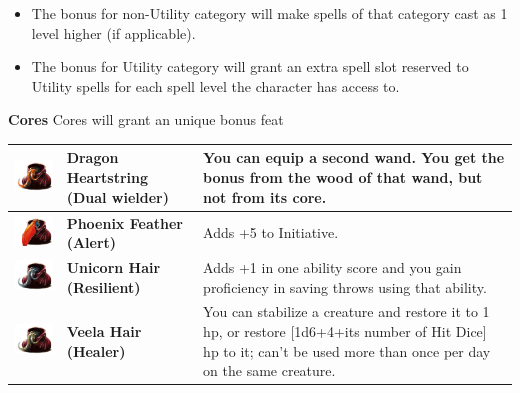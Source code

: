 \pagebreak 
\begin{itemize}
    \item The bonus for non-Utility category will make spells of that category cast as 1 level higher (if applicable).
    \item The bonus for Utility category will grant an extra spell slot reserved to Utility spells for each spell level the character has access to.
\end{itemize}

\textbf{Cores} Cores will grant an unique bonus feat \\

\begin{tabular}{ m{4cm}m{3cm}m{6cm} } \hline
	\includegraphics[width=4cm]{../Pictures/Gameplay/Items/Wearables/Wand/Cores/Dragon_heartstring_icon.png} & \textbf{Dragon Heartstring (Dual wielder)} & You can equip a second wand. You get the bonus from the wood of that wand, but not from its core. \\ \hline
	\includegraphics[width=4cm]{../Pictures/Gameplay/Items/Wearables/Wand/Cores/Phoenix_feather_icon.png} & \textbf{Phoenix Feather (Alert)} & Adds +5 to Initiative. \\ \hline
	\includegraphics[width=4cm]{../Pictures/Gameplay/Items/Wearables/Wand/Cores/Unicorn_hair_icon.png} & \textbf{Unicorn Hair (Resilient)} & Adds +1 in one ability score and you gain proficiency in saving throws using that ability.  \\ \hline
	\includegraphics[width=4cm]{../Pictures/Gameplay/Items/Wearables/Wand/Cores/Veela_hair_icon.png} & \textbf{Veela Hair (Healer)} & You can stabilize a creature and restore it to 1 hp, or restore [1d6+4+its number of Hit Dice] hp to it; can't be used more than once per day on the same creature. \\ \hline

\end{tabular}
